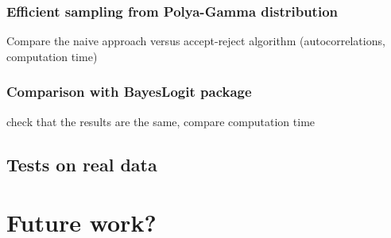 \documentclass[a4paper]{article}\usepackage[]{graphicx}\usepackage[]{color}
\begin{document}
\subsubsection{Efficient sampling from Polya-Gamma distribution}

Compare the naive approach versus accept-reject algorithm (autocorrelations, computation time)

\subsubsection{Comparison with BayesLogit package}

check that the results are the same, compare computation time

\subsection{Tests on real data}

\section{Future work?}




\end{document}
